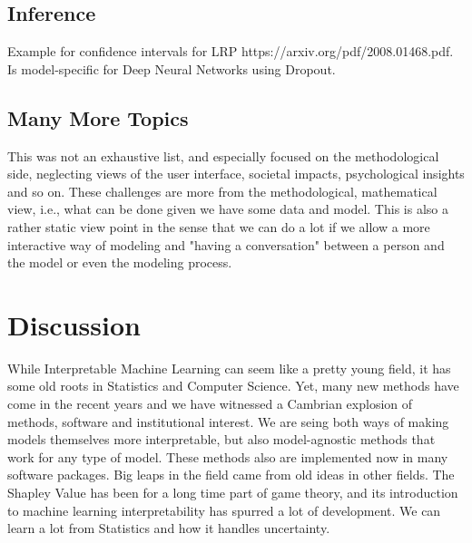 \documentclass[runningheads]{llncs}
\begin{document}
\subsection{Inference}
Example for confidence intervals for LRP https://arxiv.org/pdf/2008.01468.pdf.
Is model-specific for Deep Neural Networks using Dropout.

\subsection{Many More Topics}
This was not an exhaustive list, and especially focused on the methodological side, neglecting views of the user interface, societal impacts, psychological insights and so on.
These challenges are more from the methodological, mathematical view, i.e., what can be done given we have some data and model.
This is also a rather static view point in the sense that we can do a lot if we allow a more interactive way of modeling and "having a conversation" between a person and the model or even the modeling process.

\section{Discussion}

While Interpretable Machine Learning can seem like a pretty young field, it has some old roots in Statistics and Computer Science.
Yet, many new methods have come in the recent years and we have witnessed a Cambrian explosion of methods, software and institutional interest.
We are seing both ways of making models themselves more interpretable, but also model-agnostic methods that work for any type of model.
These methods also are implemented now in many software packages.
Big leaps in the field came from old ideas in other fields.
The Shapley Value has been for a long time part of game theory, and its introduction to machine learning interpretability has spurred a lot of development.
We can learn a lot from Statistics and how it handles uncertainty.

%
%
%
% 
%

\vskip 0.2in


\end{document}
